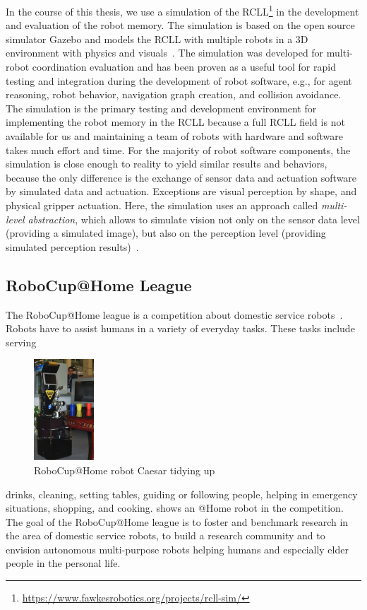In the course of this thesis, we use a simulation of the
RCLL\footnote{\url{https://www.fawkesrobotics.org/projects/rcll-sim/}}
in the development and evaluation of the robot memory. The simulation
is based on the open source simulator Gazebo and models the RCLL with
multiple robots in a 3D environment with physics and
visuals~\cite{Gazebo-Design,Gazsim-Thesis,LLSF-Sim}. The simulation
was developed for multi-robot coordination evaluation and has
been proven as a useful tool for rapid testing and integration during
the development of robot software, e.g., for agent reasoning, robot
behavior, navigation graph creation, and collision avoidance. The simulation is
the primary testing and development environment for implementing the
robot memory in the RCLL because a full RCLL field is not available for us and
maintaining a team of robots with hardware and software takes much
effort and time. For the majority of robot software components, the
simulation is close enough to reality to yield similar results and
behaviors, because the only difference is the exchange of sensor data
and actuation software by simulated data and actuation. Exceptions are
visual perception by shape, and physical gripper actuation. Here, the
simulation uses an approach called \emph{multi-level abstraction},
which allows to simulate vision not only on the sensor data level
(providing a simulated image), but also on the perception level
(providing simulated perception results)~\cite{Multi-Level-Abstraction}.

\subsection{RoboCup@Home League}
The RoboCup@Home league is a competition about domestic service
robots~\cite{wisspeintner2009robocup}. Robots have to assist
humans in a variety of everyday tasks. These tasks include
serving
\begin{figure}
  \centering
  \includegraphics[width=0.2\textwidth]{img/ceasar}%
  \caption[RoboCup@Home robot Caesar tidying up]{RoboCup@Home robot Caesar tidying up~\cite{wisspeintner2009robocup}}
  \vspace{-3mm}
  \label{fig:athome}
\end{figure}
drinks, cleaning, setting tables, guiding or following people,
helping in emergency situations, shopping, and cooking.
 shows an @Home robot in the
competition.
%
The goal of the RoboCup@Home league is to foster and benchmark
research in the area of domestic service robots, to build a research
community and to envision autonomous multi-purpose robots helping
humans and especially elder people in the personal life.

